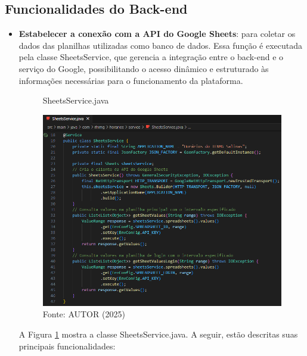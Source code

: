 \subsection{Funcionalidades do Back-end}

\begin{itemize}
    \item \textbf{Estabelecer a conexão com a API do Google Sheets}: para coletar os dados das planilhas utilizadas como banco de dados. Essa função é executada pela classe SheetsService, que gerencia a integração entre o back-end e o serviço do Google, possibilitando o acesso dinâmico e estruturado às informações necessárias para o funcionamento da plataforma.
    
    \begin{figure}[H]
        \centering
        \caption{SheetsService.java}
        \includegraphics[width=1\textwidth]{Figuras/back-2.png}
        \caption*{Fonte: AUTOR (2025)}
        \label{fig_back_2}
    \end{figure}
    
    A Figura \ref{fig_back_2} mostra a classe SheetsService.java. A seguir, estão descritas suas principais funcionalidades:


\end{itemize}
